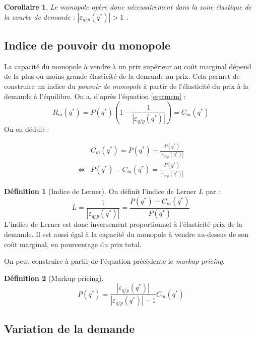 \documentclass[
]{book}
\newtheorem{corollary}{Corollaire}[chapter]
\theoremstyle{definition}
\newtheorem{definition}{Définition}[chapter]
\theoremstyle{definition}
\theoremstyle{definition}
\theoremstyle{definition}
\theoremstyle{remark}
\begin{document}
\begin{corollary}
Le monopole opère donc nécessairement dans la zone élastique de la courbe de demande : \(\left|\varepsilon_{q/p}(q^*)\right|>1\) .
\end{corollary}

\hypertarget{indice-de-pouvoir-du-monopole}{%
\subsection{Indice de pouvoir du monopole}\label{indice-de-pouvoir-du-monopole}}

La capacité du monopole à vendre à un prix supérieur au coût marginal dépend de la plus ou moins grande élasticité de la demande au prix.
Cela permet de construire un indice du \emph{pouvoir de monopole} à partir de l'élasticité du prix à la demande à l'équilibre.
On a, d'après l'équation \eqref{eq:rmcm} :
\[
R_m(q^*) = P(q^*)\left(1 - \frac{1}{|\varepsilon_{q/p}(q^*)|}\right) = C_m(q^*) 
\]
On en déduit :

\[\begin{array}{rl}
& C_m(q^*) = P(q^*) - \frac{P(q^*)}{|\varepsilon_{q/p}(q^*)|}\\
\Leftrightarrow & P(q^*) - C_m(q^*) = \frac{P(q^*)}{|\varepsilon_{q/p}(q^*)|}
\end{array}
\]

\begin{definition}[Indice de Lerner]
\protect\hypertarget{def:Lerner}{}\label{def:Lerner}On définit l'indice de Lerner \(L\) par :
\[
L=\frac{1}{|\varepsilon_{q/p}(q^*)|} = \frac{P(q^*) - C_m(q^*)}{P(q^*)} \label{eq:Lerner}
\]
L'indice de Lerner est donc inversement proportionnel à l'élasticité prix de la demande.
Il est aussi égal à la capacité du monopole à vendre au-dessus de son coût marginal, en pourcentage du prix total.
\end{definition}

On peut construire à partir de l'équation précédente le \emph{markup pricing}.

\begin{definition}[Markup pricing]
\[
P(q^*) =\frac{|\varepsilon_{q/p}(q^*)|}{|\varepsilon_{q/p}(q^*)|-1} C_m(q^*)
\]
\end{definition}

\hypertarget{variation-de-la-demande}{%
\subsection{Variation de la demande}\label{variation-de-la-demande}}
\end{document}
